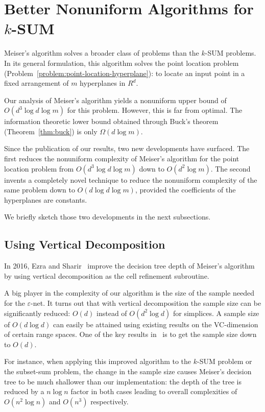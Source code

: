 \section{Better Nonuniform Algorithms for \(k\)-SUM}

Meiser's algorithm solves a broader class of problems than the \(k\)-SUM
problems. In its general formulation, this algorithm solves
the point location problem (Problem~\ref{problem:point-location-hyperplane}):
to locate an input point in a fixed arrangement of $m$ hyperplanes in $R^d$.

Our analysis of Meiser's algorithm yields a nonuniform upper bound of \(O(d^3 \log
d \log m)\) for this problem. However, this is far from optimal.
The information theoretic lower bound obtained through
Buck's theorem (Theorem~\ref{thm:buck}) is only \(\Omega(d \log m)\).

Since the publication of our results, two new developments have surfaced.
%
The first reduces the nonuniform complexity of Meiser's algorithm for the point
location problem from
\(O(d^3 \log d \log m)\) down to \(O(d^2 \log m)\).
%
The second invents a completely novel technique to reduce the nonuniform
complexity of the same problem down to \(O(d \log d \log m)\), provided the
coefficients of the hyperplanes are constants.

We briefly sketch those two developments in the next subsections.

\subsection{Using Vertical Decomposition}

In 2016, Ezra and Sharir~\cite{ES17} improve the decision tree depth of
Meiser's algorithm by using vertical decomposition as the cell refinement
subroutine.

A big player in the complexity of our algorithm is the size of the sample
needed for the \(\varepsilon\)-net. It turns out that with
vertical decomposition the sample size can be significantly reduced: $O(d)$
instead of $O(d^2 \log d)$ for simplices.
%
A sample size of $O(d \log d)$ can easily be attained using existing results on
the VC-dimension of certain range spaces. One of the key results in~\cite{ES17}
is to get the sample size down to $O(d)$.

For instance,
when applying this improved algorithm to the \(k\)-SUM problem or the
subset-sum problem,
the change in the sample size causes Meiser's decision tree to be
much shallower than our implementation:
the depth of the tree is reduced by a \(n \log n\) factor in both cases leading
to overall complexities of \(O(n^2 \log n)\) and \(O(n^3)\) respectively.

